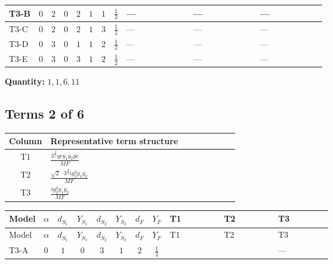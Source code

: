 \documentclass[8pt]{article}
\begin{document}
\begin{landscape}
\begin{longtable}{@{}llcccccc >{\raggedright\arraybackslash}p{0.21\linewidth} >{\raggedright\arraybackslash}p{0.21\linewidth} >{\raggedright\arraybackslash}p{0.21\linewidth}@{}}
\midrule
T3-B & $0$ & $2$ & $0$ & $2$ & $1$ & $1$ & $\frac{1}{2}$ & --- & --- & --- \\
\midrule
T3-C & $0$ & $2$ & $0$ & $2$ & $1$ & $3$ & $\frac{1}{2}$ & --- & --- & --- \\
\midrule
T3-D & $0$ & $3$ & $0$ & $1$ & $1$ & $2$ & $\frac{1}{2}$ & --- & --- & --- \\
\midrule
T3-E & $0$ & $3$ & $0$ & $3$ & $1$ & $2$ & $\frac{1}{2}$ & --- & --- & --- \\
\midrule
\bottomrule
\end{longtable}
\clearpage
\noindent\textbf{Quantity: }$\mathrm{1,1,6,11}$\par\smallskip
\subsection*{Terms 2 of 6}
\begin{center}
\begin{tabular}{@{}c >{\raggedright\arraybackslash}p{0.82\linewidth}@{}}
\toprule
Column & Representative term structure \\
\midrule
T1 & \(\displaystyle \frac{3^{\frac{3}{4}} ye \overline{y_{1}} \overline{y_{2}} \overline{ye}}{MF}\) \\
\midrule
T2 & \(\displaystyle \frac{\sqrt{2} \cdot 3^{\frac{3}{4}} i g_{2}^{2} \overline{y_{1}} \overline{y_{2}}}{MF}\) \\
\midrule
T3 & \(\displaystyle \frac{i g_{2}^{2} \overline{y_{1}} \overline{y_{2}}}{MF}\) \\
\midrule
\bottomrule
\end{tabular}
\end{center}
\smallskip
\tiny
\begin{longtable}{@{}llcccccc >{\raggedright\arraybackslash}p{0.21\linewidth} >{\raggedright\arraybackslash}p{0.21\linewidth} >{\raggedright\arraybackslash}p{0.21\linewidth}@{}}
\toprule
Model & $\alpha$ & $d_{S_1}$ & $Y_{S_1}$ & $d_{S_2}$ & $Y_{S_2}$ & $d_F$ & $Y_F$ & T1 & T2 & T3 \\
\midrule
\endfirsthead
\toprule
Model & $\alpha$ & $d_{S_1}$ & $Y_{S_1}$ & $d_{S_2}$ & $Y_{S_2}$ & $d_F$ & $Y_F$ & T1 & T2 & T3 \\
\midrule
\endhead
T3-A & $0$ & $1$ & $0$ & $3$ & $1$ & $2$ & $\frac{1}{2}$ & \scriptsize\adjustbox{max width=\linewidth}{$\begin{gathered} \frac{3^{\frac{3}{4}} ye \overline{y_{1}} \overline{y_{2}} \overline{ye}}{12 MF}\end{gathered}$} & \scriptsize\adjustbox{max width=\linewidth}{$\begin{gathered} - \frac{\sqrt{2} \cdot 3^{\frac{3}{4}} i g_{2}^{2} \overline{y_{1}} \overline{y_{2}}}{3 MF}\end{gathered}$} & --- \\

\end{longtable}
\end{landscape}
\end{document}
